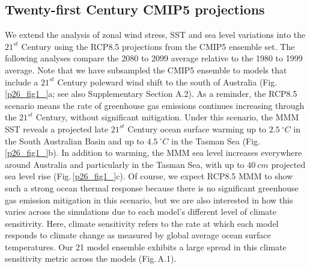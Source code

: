 \documentclass[draft,linenumbers]{agujournal2018}
\begin{document}
\subsection{Twenty-first Century CMIP5 projections}
We extend the analysis of zonal wind stress, SST and sea level variations into the $21^{st}$ Century using the RCP8.5 projections from the CMIP5 ensemble set. The following analyses compare the 2080 to 2099 average relative to the 1980 to 1999 average. Note that we have subsampled the CMIP5 ensemble to models that include a $21^{st}$ Century poleward wind shift to the south of Australia (Fig.\,\ref{p26_fig1_}a; see also Supplementary Section A.2). As a reminder, the RCP8.5 scenario means the rate of greenhouse gas emissions continues increasing through the $21^{st}$ Century, without significant mitigation. Under this scenario, the MMM SST reveals a projected late $21^{st}$ Century ocean surface warming up to $2.5\ ^{\circ}C$ in the South Australian Basin and up to $4.5\ ^{\circ}C$ in the Tasman Sea (Fig.\,\ref{p26_fig1_}b). In addition to warming, the MMM sea level increases everywhere around Australia and particularly in the Tasman Sea, with up to $40\ cm$ projected sea level rise (Fig.\,\ref{p26_fig1_}c). Of course, we expect RCP8.5 MMM to show such a strong ocean thermal response because there is no significant greenhouse gas emission mitigation in this scenario, but we are also interested in how this varies across the simulations due to each model's different level of climate sensitivity. Here, climate sensitivity refers to the rate at which each model responds to climate change as measured by global average ocean surface temperatures. Our 21 model ensemble exhibits a large spread in this climate sensitivity metric across the models (Fig.\,A.1).
\end{document}
